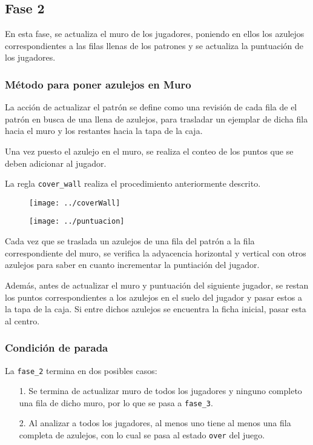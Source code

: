 \documentclass[12pt]{article}
\begin{document}
	\subsection*{Fase 2}
	En esta fase, se actualiza el muro de los jugadores, poniendo en ellos los azulejos correspondientes a las filas llenas de los patrones y se actualiza la puntuaci\'on de los jugadores.
		
	\subsubsection*{M\'etodo para poner azulejos en Muro}
	La acci\'on de actualizar el patr\'on se define como una revisi\'on de cada fila de el patr\'on en busca de una llena de azulejos, para trasladar un ejemplar de dicha fila hacia el muro y los restantes hacia la tapa de la caja.
	
	Una vez puesto el azulejo en el muro, se realiza el conteo de los puntos que se deben adicionar al jugador.
	
	La regla  \texttt{cover\_wall} realiza el procedimiento anteriormente descrito.
	
	\begin{figure}[h]
		\begin{center}
			\texttt{[image: ../coverWall]}  		
		\end{center}
	\end{figure} 

\begin{figure}[h]
	\begin{center}
		\texttt{[image: ../puntuacion]}  		
	\end{center}
\end{figure} 
Cada vez que se traslada un azulejos de una fila del patr\'on a la fila correspondiente del muro, se verifica la adyacencia horizontal y vertical con otros azulejos para saber en cuanto incrementar la puntiaci\'on del jugador. 

Adem\'as, antes de actualizar el muro y puntuaci\'on del siguiente jugador, se restan los puntos correspondientes a los azulejos en el suelo del jugador y pasar estos a la tapa de la caja. Si entre dichos azulejos se encuentra la ficha inicial, pasar esta al centro.
	
	\newpage
	\subsubsection*{Condici\'on de parada}
	La \texttt{fase\_2} termina en dos posibles casos:
	\begin{itemize}
		\item [1.] Se termina de actualizar muro de todos los jugadores y ninguno completo una fila de dicho muro, por lo que se pasa a \texttt{fase\_3}.
		\item [2.] Al analizar a todos los jugadores, al menos uno tiene al menos una fila completa de azulejos, con lo cual se pasa al estado \texttt{over} del juego.
		
	\end{itemize}
\end{document}
